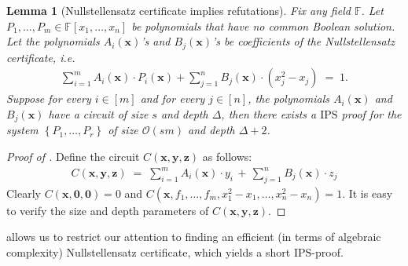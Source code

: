 \documentclass[11pt]{article}
\newtheorem{lemma}[theorem]{Lemma}
\newcommand{\bigO}{\mathcal{O}}
\newcommand{\set}[1]{\left\{ #1 \right\}}
\newcommand{\F}{\mathbb{F}}
\renewcommand{\comment}[2]{\marginpar{\tiny{\textbf{#1: }\textit{#2}}}}
\newcommand{\nl}[1]{\comment{NL}{#1}}
\newcommand{\IPS}{\mathrm{IPS}}
\begin{document}
\begin{lemma}[Nullstellensatz certificate implies refutations]\label{lemma:nullstellensatz-refutations}
Fix any field $\F$. Let $P_{1},\ldots,P_{m} \in \F[x_{1},\ldots,x_{n}]$ be polynomials that have no common Boolean solution. Let the polynomials $A_{i}(\mathbf{x})$'s and $B_{j}(\mathbf{x})$'s be coefficients of the Nullstellensatz certificate, i.e.
\begin{align*}
    \sum_{i=1}^{m} A_{i}(\mathbf{x}) \cdot P_{i}(\mathbf{x}) + \sum_{j=1}^{n} B_{j}(\mathbf{x}) \cdot (x_{j}^{2} - x_{j}) \; = \; 1.
\end{align*}
Suppose for every $i \in [m]$ and for every $j \in [n]$, the polynomials $A_{i}(\mathbf{x})$ and $B_{j}(\mathbf{x})$ have a circuit of size $s$ and depth $\Delta$, then there exists a $\IPS$ proof for the system $\set{P_{1},\ldots,P_{r}}$ of size $\bigO(sm)$ and depth $\Delta+2$.
\end{lemma}
\begin{proof}[Proof of ]
Define the circuit $C(\mathbf{x}, \mathbf{y}, \mathbf{z})$ as follows:
\begin{align*}
    C(\mathbf{x}, \mathbf{y}, \mathbf{z}) \; = \; \sum_{i=1}^{m} A_{i}(\mathbf{x}) \cdot y_{i} \, + \, \sum_{j=1}^{n} B_{j}(\mathbf{x}) \cdot z_{j}
\end{align*}
Clearly $C(\mathbf{x}, \mathbf{0}, \mathbf{0}) = 0$ and $C(\mathbf{x}, f_{1},\ldots,f_{m}, x_{1}^{2}-x_{1},\ldots,x_{n}^{2}-x_{n}) = 1$. It is easy to verify the size and depth parameters of $C(\mathbf{x}, \mathbf{y}, \mathbf{z})$.
\end{proof} 
 allows us to restrict our attention to finding an efficient (in terms of algebraic complexity) Nullstellensatz certificate, which yields a short $\IPS$-proof.




\newcommand{\Coeff}{\ensuremath{\operatorname{Coeff}}}
\newcommand{\bfCoeff}{\ensuremath{\operatorname{\mathbf{Coeff}}}}
\newcommand{\Eval}{\ensuremath{\operatorname{Eval}}}
\newcommand{\bfEval}{\ensuremath{\operatorname{\mathbf{Eval}}}}
\newcommand{\bfalpha}{\ensuremath{\boldsymbol{\alpha}}}
\newcommand{\bfw}{\ensuremath{\mathbf{w}}}
\newcommand{\Aw}{\ensuremath{A_\bfw}}
\newcommand{\Bw}{\ensuremath{B_\bfw}}
\renewcommand{\char}{\ensuremath{\operatorname{char}}}
\newcommand{\bbF}{\ensuremath{\F}}
\newcommand{\ksw}{\ensuremath{\operatorname{ks}_{\bfw}}}
\newcommand{\kswnew}[1]{\ensuremath{\operatorname{ks}_{\bfw,#1}}}
\end{document}
